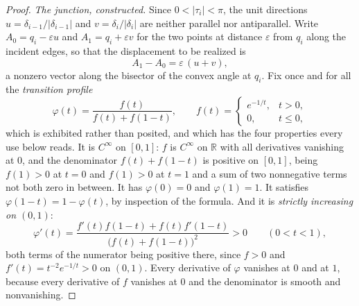 \begin{proof}
\emph{The junction, constructed.} Since $0<|\tau_i|<\pi$, the unit directions
$u=\delta_{i-1}/|\delta_{i-1}|$ and $v=\delta_i/|\delta_i|$ are neither parallel
nor antiparallel. Write $A_0=q_i-\varepsilon u$ and $A_1=q_i+\varepsilon v$ for
the two points at distance $\varepsilon$ from $q_i$ along the incident edges, so
that the displacement to be realized is
\[
   A_1-A_0=\varepsilon\,(u+v),
\]
a nonzero vector along the bisector of the convex angle at $q_i$. Fix once and
for all the \emph{transition profile}
\[
   \varphi(t)=\frac{f(t)}{f(t)+f(1-t)},
   \qquad
   f(t)=\begin{cases} e^{-1/t}, & t>0,\\ 0,& t\leq0,\end{cases}
\]
which is exhibited rather than posited, and which has the four properties every
use below reads. It is $C^\infty$ on $[0,1]$: $f$ is $C^\infty$ on $\mathbb R$
with all derivatives vanishing at $0$, and the denominator
$f(t)+f(1-t)$ is positive on $[0,1]$, being $f(1)>0$ at $t=0$ and $f(1)>0$ at
$t=1$ and a sum of two nonnegative terms not both zero in between. It has
$\varphi(0)=0$ and $\varphi(1)=1$. It satisfies $\varphi(1-t)=1-\varphi(t)$, by
inspection of the formula. And it is \emph{strictly increasing on $(0,1)$}:
\[
   \varphi'(t)=\frac{f'(t)f(1-t)+f(t)f'(1-t)}{\bigl(f(t)+f(1-t)\bigr)^2}>0
   \qquad (0<t<1),
\]
both terms of the numerator being positive there, since $f>0$ and
$f'(t)=t^{-2}e^{-1/t}>0$ on $(0,1)$. Every derivative of $\varphi$ vanishes at
$0$ and at $1$, because every derivative of $f$ vanishes at $0$ and the
denominator is smooth and nonvanishing.


\end{proof}
